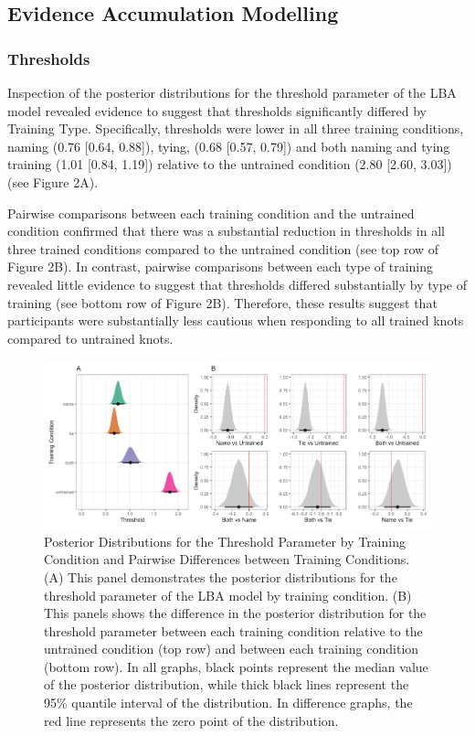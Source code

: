 \documentclass[
  man, donotrepeattitle,floatsintext]{apa6}
\begin{document}
\subsection{Evidence Accumulation Modelling}\label{evidence-accumulation-modelling}

\subsubsection{Thresholds}\label{thresholds}

Inspection of the posterior distributions for the threshold parameter of the LBA model revealed evidence to suggest that thresholds significantly differed by Training Type. Specifically, thresholds were lower in all three training conditions, naming (0.76 {[}0.64, 0.88{]}), tying, (0.68 {[}0.57, 0.79{]}) and both naming and tying training (1.01 {[}0.84, 1.19{]}) relative to the untrained condition (2.80 {[}2.60, 3.03{]}) (see Figure 2A).

Pairwise comparisons between each training condition and the untrained condition confirmed that there was a substantial reduction in thresholds in all three trained conditions compared to the untrained condition (see top row of Figure 2B). In contrast, pairwise comparisons between each type of training revealed little evidence to suggest that thresholds differed substantially by type of training (see bottom row of Figure 2B). Therefore, these results suggest that participants were substantially less cautious when responding to all trained knots compared to untrained knots.



\begin{figure}[H]

{\centering \includegraphics[height=0.67\textheight,]{../figures/from_file/thresholds} 

}

\caption{Posterior Distributions for the Threshold Parameter by Training Condition and Pairwise Differences between Training Conditions. (A) This panel demonstrates the posterior distributions for the threshold parameter of the LBA model by training condition. (B) This panels shows the difference in the posterior distribution for the threshold parameter between each training condition relative to the untrained condition (top row) and between each training condition (bottom row). In all graphs, black points represent the median value of the posterior distribution, while thick black lines represent the 95\% quantile interval of the distribution. In difference graphs, the red line represents the zero point of the distribution.}\label{fig:threshold-plot}
\end{figure}
\end{document}
